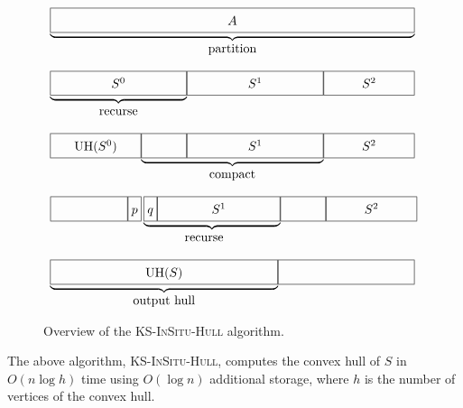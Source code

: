 \documentclass{elsart}
\begin{document}
\begin{figure}
\begin{center}
$\begin{array}{c}
   \underbrace{\framebox[4in]{\fillit $A$}} \\
   \mbox{partition}
\end{array}$

\vspace{2ex}

$\begin{array}{c@{}c@{}c}
   \underbrace{\framebox[1.5in]{\fillit $S^0$}} & 
   \framebox[1.5in]{\fillit $S^1$} 
   \framebox[1in]{\fillit $S^2$} \\
   \mbox{recurse}
\end{array}$

\vspace{2ex}

$\begin{array}{c@{}c@{}c}
   \framebox[1in]{\fillit $\mathrm{UH}(S^0)$} &
   \underbrace{\framebox[.5in]{\fillit}
   \framebox[1.5in]{\fillit $S^1$}} & 
   \framebox[1in]{\fillit $S^2$} \\
   & \mbox{compact}
\end{array}$

\vspace{2ex}

$\begin{array}{c@{}c@{}c}
   \framebox[.85in]{\fillit} &
   \framebox[.15in]{\fillit $p$}
   \underbrace{\framebox[.15in]{\fillit $q$}
   \framebox[1.35in]{\fillit $S^1$}} & 
   \framebox[.5in]{\fillit}
   \framebox[1in]{\fillit $S^2$} \\
   & \mbox{recurse}
\end{array}$

\vspace{2ex}

$\begin{array}{c@{}c@{}c}
   \underbrace{\framebox[2.5in]{\fillit $\mathrm{UH}(S)$}} &
   \framebox[1.5in]{\fillit} \\ 
   \mbox{output hull}
\end{array}$
\end{center}
\caption{Overview of the \textsc{KS-InSitu-Hull} algorithm.}
\end{figure}

\begin{thm}
The above algorithm, \textsc{KS-InSitu-Hull}, computes the convex hull
of $S$ in $O(n\log h)$ time using $O(\log n)$ additional storage,
where $h$ is the number of vertices of the convex hull.
\end{thm}
\end{document}
